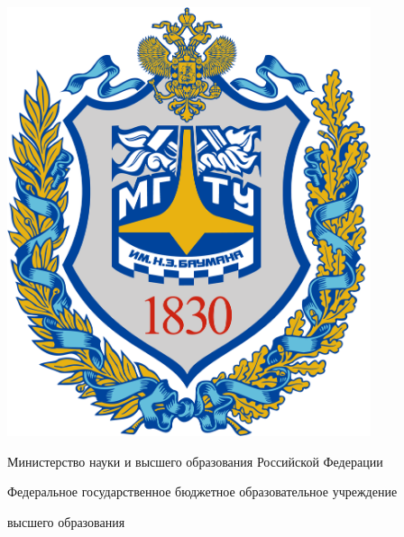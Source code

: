 
\begin{titlepage}
\thispagestyle{empty}

\ifx\wauthor\undefined\providecommand{\wauthorspace}{\vspace{7pt}}\fi

\providecommand{\wauthorspace}{}
\providecommand{\wtype}
{РАСЧЕТНО-ПОЯСНИТЕЛЬНАЯ ЗАПИСКА

\bigskip

К КУРСОВОМУ ПРОЕКТУ

\bigskip

НА ТЕМУ:

\bigskip
}
\providecommand{\wauthor}{}
\providecommand{\wgroup}{}
\providecommand{\wfirstlead}{}
\providecommand{\wleadprefix}{Руководитель курсового проекта}



\begin{minipage}{0.15\textwidth}
\centering
\includegraphics[width=0.8\textwidth]{logo.png}
\end{minipage}
\begin{minipage}{0.8\textwidth}
\fontsize{10}{15}
\centering
\bfseries

Министерство науки и высшего образования Российской
Федерации

Федеральное государственное бюджетное образовательное учреждение

высшего образования


\end{minipage}
\end{titlepage}
